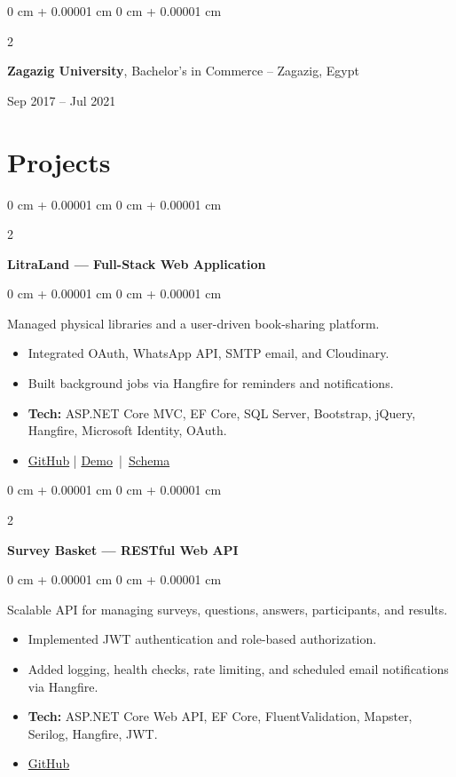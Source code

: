 \documentclass[10pt, letterpaper]{article}
\newenvironment{highlights}{
    \begin{itemize}[
        topsep=0.10 cm,
        parsep=0.10 cm,
        partopsep=0pt,
        itemsep=0pt,
        leftmargin=0 cm + 10pt
    ]
}{
    \end{itemize}
} %
\newenvironment{onecolentry}{
    \begin{adjustwidth}{
        0 cm + 0.00001 cm
    }{
        0 cm + 0.00001 cm
    }
}{
    \end{adjustwidth}
} %
\newenvironment{twocolentry}[2][]{
    \onecolentry
    \def\secondColumn{#2}
    \setcolumnwidth{\fill, 4.5 cm}
    \begin{paracol}{2}
}{
    \switchcolumn \raggedleft \secondColumn
    \end{paracol}
    \endonecolentry
} %
\begin{document}
    \vspace{0.2 cm}
    
    \begin{twocolentry}{Sep 2017 -- Jul 2021}
        \textbf{Zagazig University}, Bachelor's in Commerce -- Zagazig, Egypt
    \end{twocolentry}

    \section{Projects}
    
    \begin{twocolentry}{}
        \textbf{LitraLand — Full-Stack Web Application}
    \end{twocolentry}
    \begin{onecolentry}
        Managed physical libraries and a user-driven book-sharing platform.
        \begin{highlights}
            \item Integrated OAuth, WhatsApp API, SMTP email, and Cloudinary.
            \item Built background jobs via Hangfire for reminders and notifications.
            \item \textbf{Tech:} ASP.NET Core MVC, EF Core, SQL Server, Bootstrap, jQuery, Hangfire, Microsoft Identity, OAuth.
            \item \href{https://github.com/M7-TROJAN/LitraLand}{GitHub} | \href{https://www.youtube.com/watch?v=WQNnlcWqXuE&feature=youtu.be}{Demo} \,|\, 
            \href{https://drive.google.com/file/d/149o9Gg3hwJPQSjYAePYztfVCE8b929J_/view}{Schema} 
        \end{highlights}
    \end{onecolentry}
    
    \vspace{0.2 cm}
    
    \begin{twocolentry}{}
        \textbf{Survey Basket — RESTful Web API}
    \end{twocolentry}
    \begin{onecolentry}
        Scalable API for managing surveys, questions, answers, participants, and results.
        \begin{highlights}
            \item Implemented JWT authentication and role-based authorization.
            \item Added logging, health checks, rate limiting, and scheduled email notifications via Hangfire.
            \item \textbf{Tech:} ASP.NET Core Web API, EF Core, FluentValidation, Mapster, Serilog, Hangfire, JWT.
            \item \href{https://github.com/M7-TROJAN/Survey-Management-System}{GitHub}
        \end{highlights}
    \end{onecolentry}
    
\end{document}
